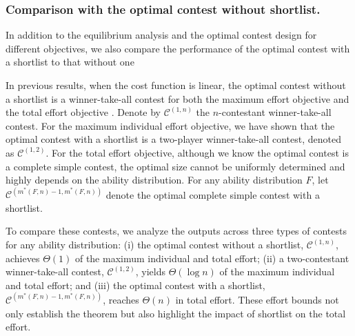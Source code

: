 




\subsubsection{Comparison with the optimal contest without shortlist.}
In addition to the equilibrium analysis and the optimal contest design for different objectives, we also compare the performance of the optimal contest with a shortlist to that without one 

In previous results, when the cost function is linear, the optimal contest without a shortlist is a winner-take-all contest for both the maximum effort objective \cite{CHS19} and the total effort objective \cite{MS01}. Denote by $\mathcal{C}^{(1,n)}$ the $n$-contestant winner-take-all contest. For the maximum individual effort objective, we have shown that the optimal contest with a shortlist is a two-player winner-take-all contest, denoted as $\mathcal{C}^{(1,2)}$. For the total effort objective, although we know the optimal contest is a complete simple contest, the optimal size cannot be uniformly determined and highly depends on the ability distribution. For any ability distribution $F$, let $\mathcal{C}^{(m^*(F,n)-1, m^*(F,n))}$ denote the optimal complete simple contest with a shortlist. 

To compare these contests, we analyze the outputs across three types of contests for any ability distribution: (i) the optimal contest without a shortlist, $\mathcal{C}^{(1,n)}$, achieves $\Theta(1)$ of the maximum individual and total effort; (ii) a two-contestant winner-take-all contest, $\mathcal{C}^{(1,2)}$,  yields $\Theta(\log n)$ of the maximum individual and total effort;  and (iii) the optimal contest with a shortlist, $\mathcal{C}^{(m^*(F,n)-1, m^*(F,n))}$, reaches $\Theta(n)$ in total effort. These effort bounds not only establish the theorem but also highlight the impact of shortlist on the total effort.


